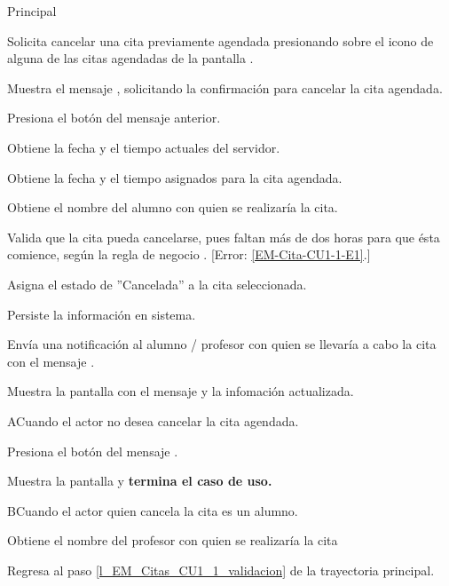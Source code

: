 \begin{UCtrayectoria}{Principal}

	\UCpaso [\UCactor] Solicita cancelar una cita previamente agendada presionando sobre el icono  de alguna de las citas agendadas de la pantalla .

	\UCpaso Muestra el mensaje , solicitando la confirmación para cancelar la cita agendada. 

	\UCpaso Presiona el botón  del mensaje anterior.  
 
	\UCpaso Obtiene la fecha y el tiempo actuales del servidor.

	\UCpaso Obtiene la fecha y el tiempo asignados para la cita agendada.

	\UCpaso Obtiene el nombre del alumno con quien se realizaría la cita. 

	\UCpaso Valida que la cita pueda cancelarse, pues faltan más de dos horas para que ésta comience, según la regla de negocio . [Error: \ref{EM-Cita-CU1-1-E1}.] \label{l_EM_Citas_CU1_1_validacion}

	\UCpaso Asigna el estado de ''Cancelada'' a la cita seleccionada. 

	\UCpaso Persiste la información en sistema. 

	\UCpaso Envía una notificación al alumno / profesor con quien se llevaría a cabo la cita con el mensaje .

	\UCpaso Muestra la pantalla  con el mensaje  y la infomación actualizada.
	
\end{UCtrayectoria}

\begin{UCtrayectoriaA}{A}{Cuando el actor no desea cancelar la cita agendada.}

	\UCpaso Presiona el botón  del mensaje .

	\UCpaso Muestra la pantalla  y \textbf{termina el caso de uso.}

\end{UCtrayectoriaA}

\begin{UCtrayectoriaA}{B}{Cuando el actor quien cancela la cita es un alumno.}

	\UCpaso Obtiene el nombre del profesor con quien se realizaría la cita

	\UCpaso Regresa al paso \ref{l_EM_Citas_CU1_1_validacion} de la trayectoria principal.

\end{UCtrayectoriaA}